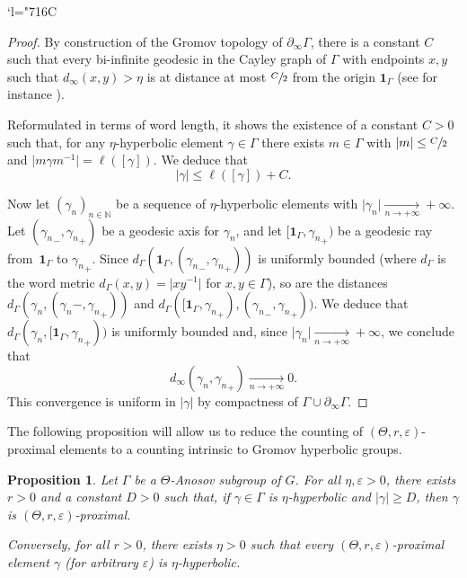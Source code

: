 \documentclass[11pt]{article}
\numberwithin{equation}{section}
\newcommand{\Changelback}{\mathcode`l="716C}
\newtheorem{prop}[theo]{Proposition}
\theoremstyle{definition}
\let\epsilon\varepsilon
\let\G\Gamma
\let\g\gamma
\begin{document}
\Changelback

\begin{proof}
By construction of the Gromov topology of $\partial_\infty \Gamma$, there is a constant $C$ such that every bi-infinite geodesic in the Cayley graph of $\G$ with endpoints $x,y$ such that $d_\infty(x,y)>\eta$ is at distance at most $\sfrac{C}{2}$ from the origin $\mathbf 1_\G$ (see for instance \cite[Lem.\,7.1]{CK}).

Reformulated in terms of word length, it shows the existence of a constant $C>0$ such that, for any $\eta$-hyperbolic element $\g\in \G$ there exists $m\in \G$ with $\vert m \vert \leq \sfrac C 2$ and $\vert m\g m^{-1}\vert = \ell([\g])$. We deduce that
\[\vert \g \vert \leq \ell([\g])+ C.\]

Now let $(\g_n)_{n\in\mathbb N}$ be a sequence of $\eta$-hyperbolic elements with $\vert \g_n \vert \underset{n\to +\infty}{\longrightarrow} +\infty$. Let $({\gamma_n}_-, {\gamma_n}_+)$ be a geodesic axis for $\gamma_n$, and let $[\mathbf 1_\G, {\gamma_n}_+)$ be a geodesic ray from~$\mathbf 1_\G$ to ${\gamma_n}_+$. Since $d_\G(\mathbf 1_\G, ({\gamma_n}_-, {\gamma_n}_+))$ is uniformly bounded (where $d_\G$ is the word metric $d_\G(x,y)=\vert xy^{-1}\vert$ for $x,y\in \G$), so are the distances $d_\G(\gamma_n, ({\gamma_n}-, {\gamma_n}_+))$ and $d_\G([\mathbf 1_\G, {\gamma_n}_+), ({\gamma_n}_-, {\gamma_n}_+))$. We deduce that $d_\G(\gamma_n, [\mathbf 1_\G, {\gamma_n}_+))$ is uniformly bounded and, since $\vert \gamma_n \vert \underset{n\to +\infty}{\longrightarrow} +\infty$, we conclude that \[d_\infty(\gamma_n, {\gamma_n}_+)\underset{n\to +\infty}{\longrightarrow} 0.\]
This convergence is uniform in $\vert \gamma \vert$ by compactness of $\Gamma \cup \partial_\infty \Gamma$.
\end{proof}

The following proposition will allow us to reduce the counting of $(\Theta,r,\epsilon)$-proximal elements to a counting intrinsic to Gromov hyperbolic groups.

\begin{prop} \label{prop - Proximal VS Hyperbolic}
Let $\Gamma$ be a $\Theta$-Anosov subgroup of $G$. For all $\eta,\epsilon>0$, there exists $r>0$ and a constant $D>0$ such that, if $\gamma \in \Gamma$ is $\eta$-hyperbolic and $\vert \gamma \vert \geq D$, then $\gamma$ is $(\Theta,r,\epsilon)$-proximal.

Conversely, for all $r>0$, there exists $\eta>0$ such that every $(\Theta,r,\epsilon)$-proximal element $\gamma$ (for arbitrary $\epsilon$) is $\eta$-hyperbolic.
\end{prop}
\end{document}
